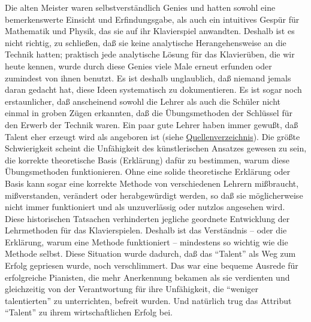 Die alten Meister waren selbstverständlich Genies und hatten sowohl eine bemerkenswerte Einsicht und Erfindungsgabe, als auch ein intuitives Gespür für Mathematik und Physik, das sie auf ihr Klavierspiel anwandten.
Deshalb ist es nicht richtig, zu schließen, daß sie keine analytische Herangehensweise an die Technik hatten; praktisch jede analytische Lösung für das Klavierüben, die wir heute kennen, wurde durch diese Genies viele Male erneut erfunden oder zumindest von ihnen benutzt.
Es ist deshalb unglaublich, daß niemand jemals daran gedacht hat, diese Ideen systematisch zu dokumentieren.
Es ist sogar noch erstaunlicher, daß anscheinend sowohl die Lehrer als auch die Schüler nicht einmal in groben Zügen erkannten, daß die Übungsmethoden der Schlüssel für den Erwerb der Technik waren.
Ein paar gute Lehrer haben immer gewußt, daß Talent eher erzeugt wird als angeboren ist (siehe \hyperref[reference]{Quellenverzeichnis}).
Die größte Schwierigkeit scheint die Unfähigkeit des künstlerischen Ansatzes gewesen zu sein, die korrekte theoretische Basis (Erklärung) dafür zu bestimmen, warum diese Übungsmethoden funktionieren.
Ohne eine solide theoretische Erklärung oder Basis kann sogar eine korrekte Methode von verschiedenen Lehrern mißbraucht, mißverstanden, verändert oder herabgewürdigt werden, so daß sie möglicherweise nicht immer funktioniert und als unzuverlässig oder nutzlos angesehen wird.
Diese historischen Tatsachen verhinderten jegliche geordnete Entwicklung der Lehrmethoden für das Klavierspielen.
Deshalb ist das Verständnis -- oder die Erklärung, warum eine Methode funktioniert -- mindestens so wichtig wie die Methode selbst.
Diese Situation wurde dadurch, daß das \enquote{Talent} als Weg zum Erfolg gepriesen wurde, noch verschlimmert.
Das war eine bequeme Ausrede für erfolgreiche Pianisten, die mehr Anerkennung bekamen als sie verdienten und gleichzeitig von der Verantwortung für ihre Unfähigkeit, die \enquote{weniger talentierten} zu unterrichten, befreit wurden.
Und natürlich trug das Attribut \enquote{Talent} zu ihrem wirtschaftlichen Erfolg bei.

